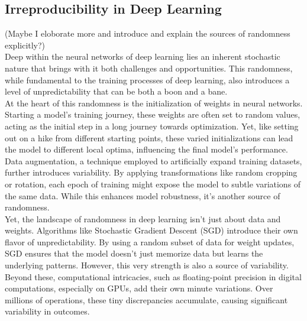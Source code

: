 \subsection{Irreproducibility in Deep Learning}

(Maybe I eloborate more and introduce and explain the sources of randomness explicitly?)\\

Deep within the neural networks of deep learning lies an inherent stochastic nature that brings with it both challenges and opportunities. This randomness, while fundamental to the training processes of deep learning, also introduces a level of unpredictability that can be both a boon and a bane.\\

At the heart of this randomness is the initialization of weights in neural networks. Starting a model's training journey, these weights are often set to random values, acting as the initial step in a long journey towards optimization. Yet, like setting out on a hike from different starting points, these varied initializations can lead the model to different local optima, influencing the final model's performance.\\

Data augmentation, a technique employed to artificially expand training datasets, further introduces variability. By applying transformations like random cropping or rotation, each epoch of training might expose the model to subtle variations of the same data. While this enhances model robustness, it's another source of randomness.\\

Yet, the landscape of randomness in deep learning isn't just about data and weights. Algorithms like Stochastic Gradient Descent (SGD) introduce their own flavor of unpredictability. By using a random subset of data for weight updates, SGD ensures that the model doesn't just memorize data but learns the underlying patterns. However, this very strength is also a source of variability.\\

Beyond these, computational intricacies, such as floating-point precision in digital computations, especially on GPUs, add their own minute variations. Over millions of operations, these tiny discrepancies accumulate, causing significant variability in outcomes.\\

